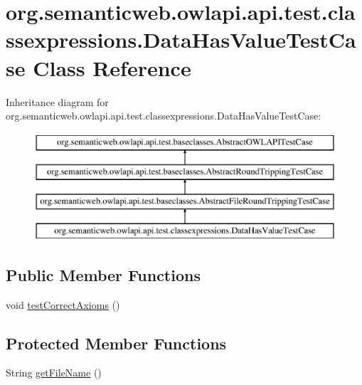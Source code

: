 \hypertarget{classorg_1_1semanticweb_1_1owlapi_1_1api_1_1test_1_1classexpressions_1_1_data_has_value_test_case}{\section{org.\-semanticweb.\-owlapi.\-api.\-test.\-classexpressions.\-Data\-Has\-Value\-Test\-Case Class Reference}
\label{classorg_1_1semanticweb_1_1owlapi_1_1api_1_1test_1_1classexpressions_1_1_data_has_value_test_case}
}
Inheritance diagram for org.\-semanticweb.\-owlapi.\-api.\-test.\-classexpressions.\-Data\-Has\-Value\-Test\-Case\-:\begin{figure}[H]
\begin{center}
\leavevmode
\includegraphics[height=4.000000cm]{classorg_1_1semanticweb_1_1owlapi_1_1api_1_1test_1_1classexpressions_1_1_data_has_value_test_case}
\end{center}
\end{figure}
\subsection*{Public Member Functions}
\begin{DoxyCompactItemize}
\item 
void \hyperlink{classorg_1_1semanticweb_1_1owlapi_1_1api_1_1test_1_1classexpressions_1_1_data_has_value_test_case_a05c53d0a65de87420a80d371a6b678f8}{test\-Correct\-Axioms} ()
\end{DoxyCompactItemize}
\subsection*{Protected Member Functions}
\begin{DoxyCompactItemize}
\item 
String \hyperlink{classorg_1_1semanticweb_1_1owlapi_1_1api_1_1test_1_1classexpressions_1_1_data_has_value_test_case_a59e9459a0d2f9cec1dcc445673fe45b6}{get\-File\-Name} ()
\end{DoxyCompactItemize}


